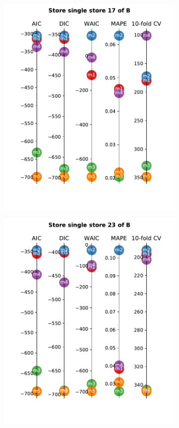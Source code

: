 \documentclass[english, 12pt, a4paper, sci, utf8, a-1b, online]{aaltothesis}
\begin{document}
\begin{figure}
\begin{subfigure}[htb]{0.33\textwidth}
		\includegraphics[width=\textwidth]{../plots/metrics/metrics_plot_single_store_17_of_B.pdf}
	\end{subfigure}
	\begin{subfigure}[htb]{0.33\textwidth}
		\centering
		\includegraphics[width=\textwidth]{../plots/metrics/metrics_plot_single_store_23_of_B.pdf}

\end{subfigure}
\end{figure}
\end{document}
